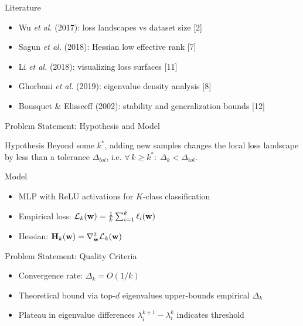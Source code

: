 \documentclass{beamer}
\begin{document}
\begin{frame}{Literature}
    \begin{itemize}
        \item Wu \textit{et al.} (2017): loss landscapes vs dataset size [2]
        \item Sagun \textit{et al.} (2018): Hessian low effective rank [7]
        \item Li \textit{et al.} (2018): visualizing loss surfaces [11]
        \item Ghorbani \textit{et al.} (2019): eigenvalue density analysis [8]
        \item Bousquet \& Elisseeff (2002): stability and generalization bounds [12]
    \end{itemize}
\end{frame}

\begin{frame}{Problem Statement: Hypothesis and Model}
    \begin{block}{Hypothesis}
        Beyond some $k^*$, adding new samples changes the local loss landscape by less than a tolerance $\Delta_{tol}$, i.e.
        $\forall\, k \ge k^* : \; \Delta_k < \Delta_{tol}$.
    \end{block}
    \begin{block}{Model}
        \begin{itemize}
            \item MLP with ReLU activations for $K$-class classification
            \item Empirical loss: $\mathcal{L}_k(\mathbf{w}) = \frac1k \sum_{i=1}^k \ell_i(\mathbf{w})$
            \item Hessian: $\mathbf{H}_k(\mathbf{w}) = \nabla^2_{\mathbf{w}} \mathcal{L}_k(\mathbf{w})$
        \end{itemize}
    \end{block}
\end{frame}

\begin{frame}{Problem Statement: Quality Criteria}
    \begin{itemize}
        \item Convergence rate: $\Delta_k = O(1/k)$
        \item Theoretical bound via top-$d$ eigenvalues upper-bounds empirical $\Delta_k$
        \item Plateau in eigenvalue differences $\lambda_i^{k+1}-\lambda_i^k$ indicates threshold
    \end{itemize}
\end{frame}
\end{document}

